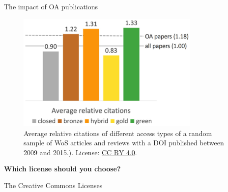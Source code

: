 \documentclass{beamer}
\begin{document}
\begin{frame}{The impact of OA publications}
	\begin{figure}
		\includegraphics[width=0.8\textwidth]{piwowar_et_al_4.jpg}
		\caption{Average relative citations of different access types of a random sample of WoS articles and reviews with a DOI published between 2009 and 2015.). License: \href{https://creativecommons.org/licenses/by/4.0/}{CC BY 4.0}.}
	\end{figure}
\end{frame}


\begin{frame}{}
\begin{center}
	\textbf{\large Which license should you choose?}
\end{center}
\end{frame}


\begin{frame}{The Creative Commons Licenses}
	\begin{itemize}
	\end{itemize}
\end{frame}

\end{document}
